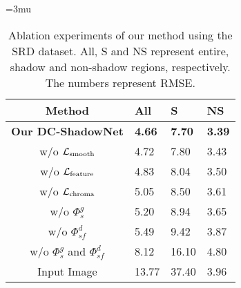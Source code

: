 \documentclass[10pt,twocolumn,letterpaper]{article}
\begin{document}
\begin{table}[t!]
	\small
	\centering
	\thickmuskip=3mu
	\renewcommand{\arraystretch}{1.2}
	\caption {Ablation experiments of our method using the SRD dataset. All, S and NS represent entire, shadow and non-shadow regions, respectively. The numbers represent RMSE.}	
	\label{tb:ablation}
	\begin{tabularx}{\columnwidth}{ c|Y|Y|Y }
		\toprule
		Method							&All &S &NS\\
\hline
		\bf Our DC-ShadowNet 			&\bf4.66 &\bf7.70  &\bf3.39\\	
		\hline
		w/o $\mathcal{L}_{\rm smooth}$  &4.72 &7.80 &3.43\\
w/o $\mathcal{L}_{\rm feature}$ &4.83 &8.04  &3.50\\
w/o $\mathcal{L}_{\rm chroma}$  &5.05 &8.50  &3.61\\
w/o $\Phi^g_s$       	        &5.20 &8.94  &3.65\\
w/o $\Phi^d_{sf}$       	    &5.49 &9.42  &3.87\\
w/o $\Phi^g_s$ and $\Phi^d_{sf}$   &8.12 &16.10  &4.80\\
		\hline
		Input Image                 	&13.77 &37.40 &3.96\\
		\bottomrule	
	\end{tabularx}
\end{table}
\end{document}
